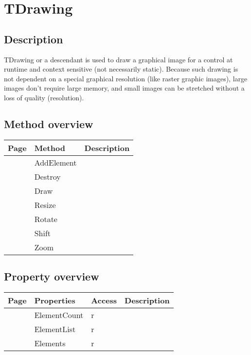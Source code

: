 \section{TDrawing}
\label{hmi:drawncontrol:tdrawing}
\subsection{Description}
TDrawing or a descendant is used to draw a graphical image for a control at runtime and context sensitive (not necessarily static). Because such drawing is not dependent on a special graphical resolution (like raster graphic images), large images don't require large memory, and small images can be stretched without a loss of quality (resolution). %
\subsection{Method overview}
\label{hmi:drawncontrol:tdrawing:methods}
\begin{tabularx}{\textwidth}{llX}
Page & Method & Description  \\ \hline
\pageref{hmi:drawncontrol:tdrawing:addelement} & AddElement  &  \\
\pageref{hmi:drawncontrol:tdrawing:destroy} & Destroy  &  \\
\pageref{hmi:drawncontrol:tdrawing:draw} & Draw  &  \\
\pageref{hmi:drawncontrol:tdrawing:resize} & Resize  &  \\
\pageref{hmi:drawncontrol:tdrawing:rotate} & Rotate  &  \\
\pageref{hmi:drawncontrol:tdrawing:shift} & Shift  &  \\
\pageref{hmi:drawncontrol:tdrawing:zoom} & Zoom  &  \\
\hline
\end{tabularx}
\subsection{Property overview}
\label{hmi:drawncontrol:tdrawing:properties}
\begin{tabularx}{\textwidth}{lllX}
Page & Properties & Access & Description \\ \hline
\pageref{hmi:drawncontrol:tdrawing:elementcount} & ElementCount & r &  \\
\pageref{hmi:drawncontrol:tdrawing:elementlist} & ElementList & r &  \\
\pageref{hmi:drawncontrol:tdrawing:elements} & Elements & r &  \\
\hline
\end{tabularx}
